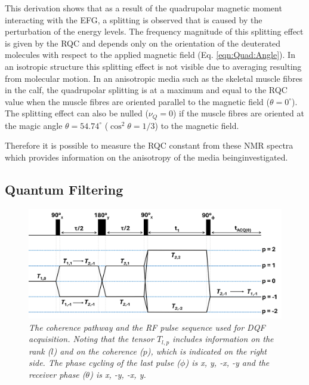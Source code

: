 This derivation shows that as a result of the quadrupolar magnetic moment interacting with the \ac{EFG}, a splitting is observed that is caused by the perturbation of the energy levels. The frequency magnitude of this splitting effect is given by the \ac{RQC} and depends only on the orientation of the deuterated  molecules with respect to the applied magnetic field (Eq. \ref{eqn:Quad:Angle}). In an isotropic structure this splitting effect is not visible due to averaging resulting from molecular motion. In an anisotropic media such as the skeletal muscle fibres in the calf, the quadrupolar splitting is at a maximum and equal to the \ac{RQC} value when the muscle fibres are oriented parallel to the magnetic field ($\theta = 0^\circ$). The splitting effect can also be nulled ($\nu_Q = 0$) if the muscle fibres are oriented at the magic angle $\theta = 54.74^\circ$ ($\cos^2\theta=1/3$) to the magnetic field.

Therefore it is possible to measure the \ac{RQC} constant from these \ac{NMR} spectra which provides information on the anisotropy of the media beinginvestigated.


\subsection{Quantum Filtering}

\begin{figure}
    \centering
    \includegraphics[width=1\textwidth]{Figures/Quad/DQF_Coherence.png}
    \caption{\textit{The coherence pathway and the RF pulse sequence used for \ac{DQF} acquisition. Noting that the tensor $T_{l,p}$ includes information on the rank ($l$) and on the coherence ($p$), which is indicated on the right side. The phase cycling of the last pulse ($\phi$) is x, y, -x, -y and the receiver phase ($\theta$) is x, -y, -x, y.}}
    \label{fig:Quad:Coherence}
\end{figure}

